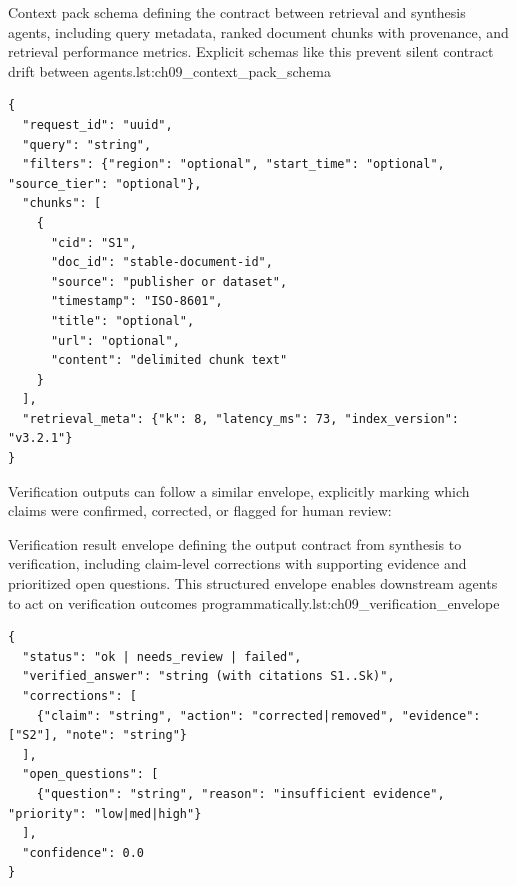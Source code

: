 \begin{codebox}{Context pack schema defining the contract between retrieval and synthesis agents, including query metadata, ranked document chunks with provenance, and retrieval performance metrics. Explicit schemas like this prevent silent contract drift between agents.}{lst:ch09_context_pack_schema}
\begin{verbatim}
{
  "request_id": "uuid",
  "query": "string",
  "filters": {"region": "optional", "start_time": "optional", "source_tier": "optional"},
  "chunks": [
    {
      "cid": "S1",
      "doc_id": "stable-document-id",
      "source": "publisher or dataset",
      "timestamp": "ISO-8601",
      "title": "optional",
      "url": "optional",
      "content": "delimited chunk text"
    }
  ],
  "retrieval_meta": {"k": 8, "latency_ms": 73, "index_version": "v3.2.1"}
}
\end{verbatim}
\end{codebox}

Verification outputs can follow a similar envelope, explicitly marking which claims were confirmed, corrected, or flagged for human review:

\begin{codebox}{Verification result envelope defining the output contract from synthesis to verification, including claim-level corrections with supporting evidence and prioritized open questions. This structured envelope enables downstream agents to act on verification outcomes programmatically.}{lst:ch09_verification_envelope}
\begin{verbatim}
{
  "status": "ok | needs_review | failed",
  "verified_answer": "string (with citations S1..Sk)",
  "corrections": [
    {"claim": "string", "action": "corrected|removed", "evidence": ["S2"], "note": "string"}
  ],
  "open_questions": [
    {"question": "string", "reason": "insufficient evidence", "priority": "low|med|high"}
  ],
  "confidence": 0.0
}
\end{verbatim}
\end{codebox}

